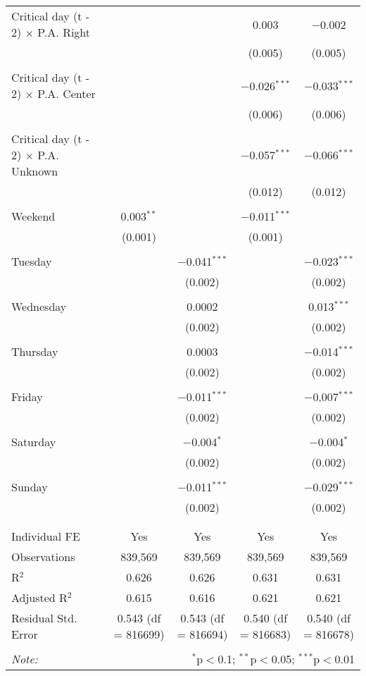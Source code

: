 \documentclass[
]{article}
\begin{document}
\begin{table}[!htbp]
{\begin{tabular}{@{\extracolsep{5pt}}lcccc}
 Critical day (t - 2) $\times$ P.A. Right &  &  & 0.003 & $-$0.002 \\ 
  &  &  & (0.005) & (0.005) \\ 
  & & & & \\ 
 Critical day (t - 2) $\times$ P.A. Center &  &  & $-$0.026$^{***}$ & $-$0.033$^{***}$ \\ 
  &  &  & (0.006) & (0.006) \\ 
  & & & & \\ 
 Critical day (t - 2) $\times$ P.A. Unknown &  &  & $-$0.057$^{***}$ & $-$0.066$^{***}$ \\ 
  &  &  & (0.012) & (0.012) \\ 
  & & & & \\ 
 Weekend & 0.003$^{**}$ &  & $-$0.011$^{***}$ &  \\ 
  & (0.001) &  & (0.001) &  \\ 
  & & & & \\ 
 Tuesday &  & $-$0.041$^{***}$ &  & $-$0.023$^{***}$ \\ 
  &  & (0.002) &  & (0.002) \\ 
  & & & & \\ 
 Wednesday &  & 0.0002 &  & 0.013$^{***}$ \\ 
  &  & (0.002) &  & (0.002) \\ 
  & & & & \\ 
 Thursday &  & 0.0003 &  & $-$0.014$^{***}$ \\ 
  &  & (0.002) &  & (0.002) \\ 
  & & & & \\ 
 Friday &  & $-$0.011$^{***}$ &  & $-$0.007$^{***}$ \\ 
  &  & (0.002) &  & (0.002) \\ 
  & & & & \\ 
 Saturday &  & $-$0.004$^{*}$ &  & $-$0.004$^{*}$ \\ 
  &  & (0.002) &  & (0.002) \\ 
  & & & & \\ 
 Sunday &  & $-$0.011$^{***}$ &  & $-$0.029$^{***}$ \\ 
  &  & (0.002) &  & (0.002) \\ 
  & & & & \\ 
\hline \\[-1.8ex] 
Individual FE & Yes & Yes & Yes & Yes \\ 
Observations & 839,569 & 839,569 & 839,569 & 839,569 \\ 
R$^{2}$ & 0.626 & 0.626 & 0.631 & 0.631 \\ 
Adjusted R$^{2}$ & 0.615 & 0.616 & 0.621 & 0.621 \\ 
Residual Std. Error & 0.543 (df = 816699) & 0.543 (df = 816694) & 0.540 (df = 816683) & 0.540 (df = 816678) \\ 
\hline 
\hline \\[-1.8ex] 
\textit{Note:}  & \multicolumn{4}{r}{$^{*}$p$<$0.1; $^{**}$p$<$0.05; $^{***}$p$<$0.01} \\ 
\end{tabular}
} 
\end{table} 
\newpage
\end{document}
